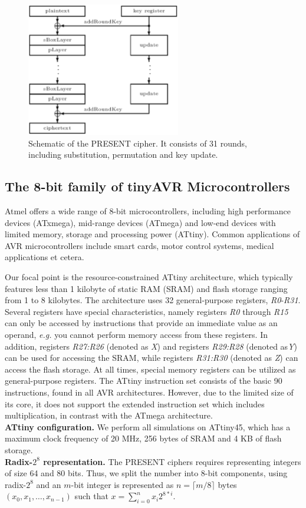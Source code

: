\documentclass[11pt]{article}
\begin{document}
\begin{figure}[h]
	\label{present_schematic}
	\centering
	 \includegraphics [width=0.6\textwidth]{present.eps}
\caption{\footnotesize Schematic of the PRESENT cipher. It consists of 31 rounds, including substitution, permutation and key update.}
\end{figure}
\subsection{The 8-bit family of tinyAVR Microcontrollers}
Atmel offers a wide range of 8-bit microcontrollers, including high performance devices (ATxmega), mid-range devices (ATmega) and low-end devices with limited memory, storage and processing power (ATtiny). Common applications of AVR microcontrollers include smart cards, motor control systems, medical applications et cetera. 

Our focal point is the resource-constrained ATtiny architecture, which typically features less than 1 kilobyte of static RAM (SRAM) and flash storage ranging from 1 to 8 kilobytes. The architecture uses 32 general-purpose registers, \textit{R0}-\textit{R31}.
Several registers have special characteristics, namely registers \textit{R0} through \textit{R15} can only be accessed by instructions that provide an immediate value as an operand, \emph{e.g.} you cannot perform memory access from these registers. In addition, registers \textit{R27:R26} (denoted as \emph{X}) and registers \textit{R29:R28} (denoted as\emph{Y}) can be used for accessing the SRAM, while registers \textit{R31:R30} (denoted as \emph{Z}) can access the flash storage. At all times, special memory registers can be utilized as general-purpose registers.
The ATtiny instruction set consists of the basic 90 instructions, found in all AVR architectures. However, due to the limited size of its core, it does not support the extended instruction set which includes multiplication, in contrast with the ATmega architecture.\\
\textbf{ATtiny configuration.} We perform all simulations on ATtiny45, which has a maximum clock frequency of 20 MHz, 256 bytes of SRAM and 4 KB of flash storage.\\
\textbf{Radix-$2^8$ representation.} The PRESENT ciphers requires representing integers of size 64 and 80 bits. Thus, we split the number into 8-bit components, using radix-$2^8$ and an $m$-bit integer is represented as $n=\lceil{m/8}\rceil$ bytes $(x_0,x_1,\dots,x_{n-1})$ such that $x=\sum_{i=0}^n{x_i 2^{8*i}}$.
\end{document}

